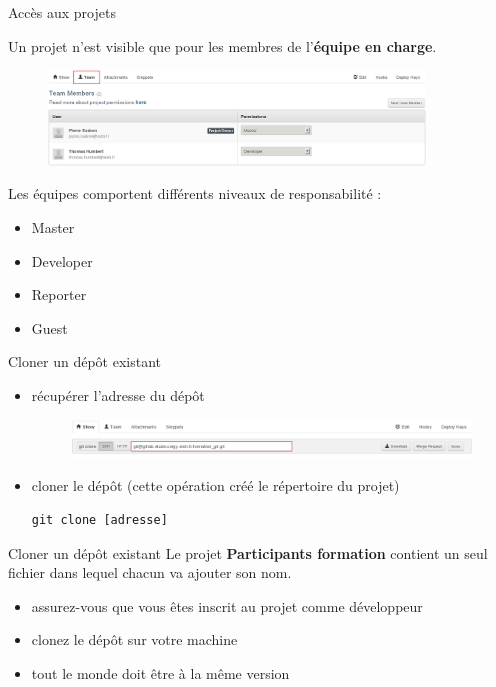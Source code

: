 \documentclass{beamer}
\begin{document}
\begin{frame}{Accès aux projets}

Un projet n'est visible que pour les membres de l'\textbf{équipe en charge}.
\vspace{-.3cm}
	\begin{figure}
		\centering
		\includegraphics[width=10cm]{img/shot14}
	\end{figure}
	\vspace{-.3cm}
Les équipes comportent différents niveaux de responsabilité :
	\begin{itemize}
		\item Master
		\item Developer
		\item Reporter
		\item Guest	
	\end{itemize}	 
\end{frame}

\begin{frame}[fragile]{Cloner un dép\^ot existant}

	\begin{itemize}
		\item récupérer l'adresse du dép\^ot
		\begin{figure}
			\centering
			\includegraphics[width=11cm]{img/shot13}
		\end{figure}
		\item cloner le dép\^ot	(cette opération créé le répertoire du projet)
		\begin{lstlisting}[frame=single]
		git clone [adresse]
		\end{lstlisting}
	\end{itemize}
\end{frame}

\begin{frame}{Cloner un dépôt existant}
	Le projet \textbf{Participants formation} contient un seul fichier dans lequel chacun va ajouter son nom.	
	\begin{itemize}
		\item assurez-vous que vous êtes inscrit au projet comme développeur
		\item clonez le dépôt sur votre machine
		\item tout le monde doit être à la même version
	\end{itemize}
\end{frame}
\end{document}

